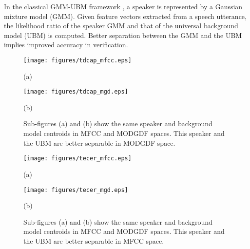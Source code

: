 \documentclass{article}
\begin{document}
In the classical GMM-UBM framework \cite{reynoldsAdaptedGMM}, a speaker is
represented by a Gaussian mixture model (GMM). Given feature vectors extracted
from a speech utterance, the likelihood ratio of the speaker GMM and that of the
universal background model (UBM) is computed. Better separation between the GMM
and the UBM implies improved accuracy in verification.

\begin{figure}[h]
\centering 
\begin{minipage}[c]{0.5\textwidth}
\centering 
    \texttt{[image: figures/tdcap\_mfcc.eps]}
	\caption*{(a)}
\end{minipage}%
\begin{minipage}[c]{0.35\textwidth}
\centering  
    \texttt{[image: figures/tdcap\_mgd.eps]}
	\caption*{(b)}
\end{minipage}
\caption{Sub-figures (a) and (b) show the same speaker and background model centroids in MFCC and MODGDF spaces. This speaker and the UBM are better separable in 
MODGDF space.}
\label{fig:ubm_sep1}
\end{figure}

\begin{figure}[h]
\centering 
\begin{minipage}[c]{0.45\textwidth}
\centering 
    \texttt{[image: figures/tecer\_mfcc.eps]}
	\caption*{(a)}
\end{minipage}%
\begin{minipage}[c]{0.45\textwidth}
\centering  
    \texttt{[image: figures/tecer\_mgd.eps]}
	\caption*{(b)}
\end{minipage}
\caption{Sub-figures (a) and (b) show the same speaker and background model centroids in MFCC and MODGDF spaces. This speaker and the UBM are better separable in 
MFCC space.}
\label{fig:ubm_sep2}
\end{figure}
\end{document}
